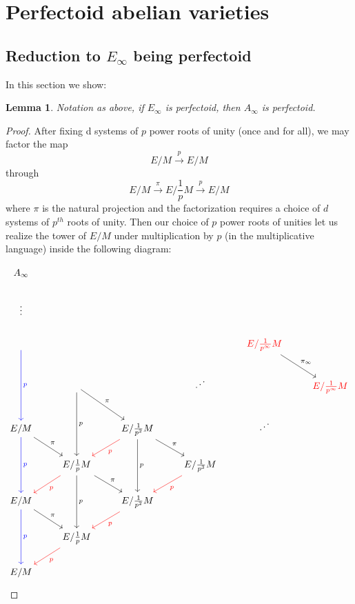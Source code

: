 \documentclass[11pt,oneside]{amsart}
\theoremstyle{theorem}
\newtheorem{lemma}[theorem]{Lemma}
\theoremstyle{definition}
\theoremstyle{remark}
\begin{document}
\section{Perfectoid abelian varieties}

\subsection{Reduction to $E_\infty$ being perfectoid}

In this section we show: 

\begin{lemma} \label{lemma:reduction_to_E}
Notation as above, if $E_\infty$ is perfectoid, then $A_\infty$ is perfectoid.  
\end{lemma}


\begin{proof} 



After fixing d systems of $p$ power roots of unity (once and for all), we may factor the map 
$$E/M \xrightarrow{ p} E/M$$ through 
$$E/M \xrightarrow{\pi} E/\frac{1}{p} M \xrightarrow{ p} E/M $$ where $\pi $ is the natural projection and the factorization requires a choice of $d$ systems of $p^{th}$ roots of unity. Then our choice of $p$ power roots of unities let us realize the tower of $E/M$ under multiplication by $p$ (in the multiplicative language) inside the following diagram: 



\[
\begin{tikzcd}
A_\infty  \\
\vdots \\ 
 \arrow[blue]{dd}{p} & & & & {\color{red} E/\frac{1}{p^\infty} M }  \arrow{rd}{\pi_\infty}  \\
\empty & \empty  \arrow{dd}{p} \arrow{rd}{\pi} & & \reflectbox{$\ddots$}  & &  
{\color{red} E/\frac{1}{p^\infty} M }  \\
E/M  \arrow{rd}{\pi}  \arrow[blue]{dd}{p}    & &              E/\frac{1}{p^2}M   \arrow{rd}{\pi} \arrow{dd}{p}  \arrow[red]{ld}{p}  & & \reflectbox{$\ddots$} \\
 &       E/\frac{1}{p}M   \arrow{dd}{p}    \arrow{rd}{\pi}      \arrow[red]{ld}{p}         &&         E/\frac{1}{p^3}M   \arrow[red]{ld}{p}  \\
E/M  \arrow[blue]{dd}{p}   \arrow{rd}{\pi}          &&              E/\frac{1}{p^2}M   \arrow[red]{ld}{p} \\
   &     E/\frac{1}{p}M       \arrow[red]{ld}{p}   && \\
E/M
\end{tikzcd}
\]




\end{proof}
\end{document}
